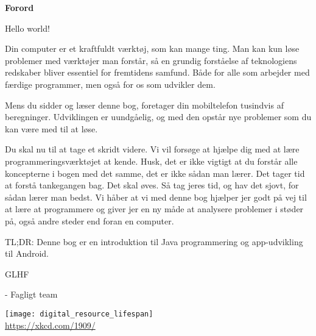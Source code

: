 \cleardoublepage
\begin{titlepage}
	{\centering
	\vspace{3cm}
	{\Huge\sffamily\bfseries Forord \par} \vspace{0.5cm}}
	\noindent
	Hello world!
	
	Din computer er et kraftfuldt værktøj, som kan mange ting. Man kan kun løse problemer med værktøjer man forstår, så en grundig forståelse af teknologiens redskaber bliver essentiel for fremtidens samfund. Både for alle som arbejder med færdige programmer, men også for os som udvikler dem. 
	
	Mens du sidder og læser denne bog, foretager din mobiltelefon tusindvis af beregninger. Udviklingen er uundgåelig, og med den opstår nye problemer som du kan være med til at løse. 
	
	Du skal nu til at tage et skridt videre. Vi vil forsøge at hjælpe dig med at lære programmeringsværktøjet at kende.
	Husk, det er ikke vigtigt at du forstår alle koncepterne i bogen med det samme, det er ikke sådan man lærer.
	Det tager tid at forstå tankegangen bag. Det skal øves.
	Så tag jeres tid, og hav det sjovt, for sådan lærer man bedst.
	Vi håber at vi med denne bog hjælper jer godt på vej til at lære at programmere og giver jer en ny måde at analysere problemer i støder på, også andre steder end foran en computer.
	
	TL;DR: Denne bog er en introduktion til Java programmering og app-udvikling til Android. 
	
	GLHF
	
	- Fagligt team
	
	{\centering
	{\texttt{[image: digital\_resource\_lifespan]}\\
		\tiny \url{https://xkcd.com/1909/} \par} \vspace{0.5cm}}
\end{titlepage}
